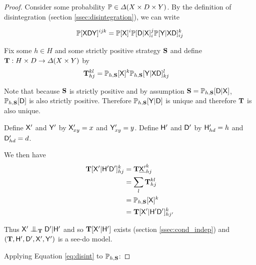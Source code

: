 \begin{proof}
Consider some probability $\mathbb{P}\in \Delta(X\times D\times Y)$. By the definition of disintegration (section \ref{ssec:disintegration}), we can write

\begin{align}
 \mathbb{P}[\mathsf{XDY}]^{ijk} = \mathbb{P}[\mathsf{X}]^i\mathbb{P}[\mathsf{D}|\mathsf{X}]_i^{j} \mathbb{P}[\mathsf{Y}|\mathsf{XD}]_{ij}^{k} \label{eq:disint}
\end{align}

Fix some $h\in H$ and some strictly positive strategy $\mathbf{S}$ and define $\mathbf{T}:H\times D\to \Delta(X\times Y)$ by
\begin{align}
    \mathbf{T}_{hj}^{kl} &= \mathbb{P}_{h,\mathbf{S}}[\mathsf{X}]^k \mathbb{P}_{h,\mathbf{S}}[\mathsf{Y}|\mathsf{X}\mathsf{D}]^l_{kj} \label{eq:comb_disint}
\end{align}

Note that because $\mathbf{S}$ is strictly positive and by assumption $\mathbf{S}=\mathbb{P}_{h,\mathbf{S}}[\mathsf{D}|\mathsf{X}]$, $\mathbb{P}_{h,\mathbf{S}}[\mathsf{D}]$ is also strictly positive. Therefore $\mathbb{P}_{h,\mathbf{S}}[\mathsf{Y}|\mathsf{D}]$ is unique and therefore $\mathbf{T}$ is also unique.

Define $\mathsf{X}'$ and $\mathsf{Y}'$ by $\mathsf{X}'_{xy}=x$ and $\mathsf{Y}'_{xy}=y$. Define $\mathsf{H}'$ and $\mathsf{D}'$ by $\mathsf{H}'_{hd} = h$ and $\mathsf{D}'_{hd} = d$.

We then have
\begin{align}
    \mathbf{T}[\mathsf{X'}|\mathsf{H'D'}]_{hj}^{k} &= \mathbf{T}\underline{\mathsf{X}'}_{hj}^k\\
                                           &= \sum_l \mathbf{T}_{hj}^{kl} \\
                                           &= \mathbb{P}_{h,\mathbf{S}}[\mathsf{X}]^k\\
                                           &= \mathbf{T}[\mathsf{X'}|\mathsf{H'D'}]_{hj'}^{k}
\end{align}

Thus $\RV{X}'\CI_{\kernel{T}} \RV{D}'|\RV{H}'$ and so $\mathbf{T}[\mathsf{X}'|\mathsf{H}']$ exists (section \ref{ssec:cond_indep}) and $(\mathbf{T},\mathsf{H}',\mathsf{D}',\mathsf{X}',\mathsf{Y}')$ is a see-do model.

Applying Equation \ref{eq:disint} to $\mathbb{P}_{h,\mathbf{S}}$:


\end{proof}
